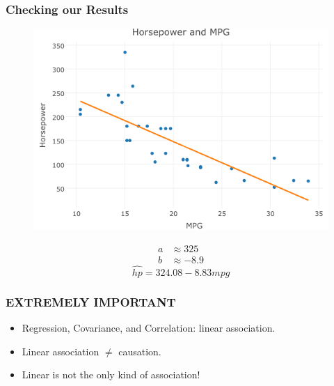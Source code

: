 \documentclass{beamer}
\begin{document}
\begin{frame}
\frametitle{Checking our Results}
	\begin{figure}
		\includegraphics[scale = 0.4]{./images/carsFitted.png}
	\end{figure}
	\begin{align*}
		a &\approx 325
		\\
		b &\approx -8.9
	\end{align*}
	$$
	\widehat{hp} = 324.08 - 8.83 mpg
	$$
\end{frame}

\begin{frame}
\frametitle{\alert{EXTREMELY IMPORTANT}}
	\begin{itemize}
		\item Regression, Covariance, and Correlation: linear association.
		\item Linear association $\neq$ causation. 
		\item Linear is not the only kind of association!
	\end{itemize}
\end{frame}
\end{document}
